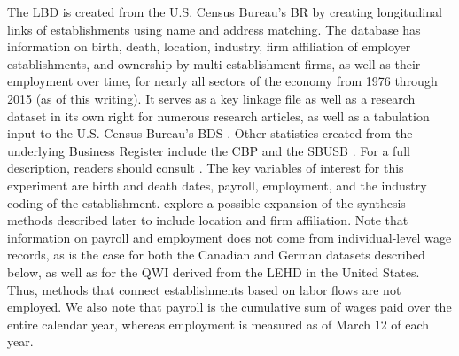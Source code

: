 The \ac{LBD} \citep{LBD} is created from the U.S. Census Bureau's \ac{BR} by creating longitudinal links of establishments using name and address matching. The database has information on birth, death, location, industry,  firm  affiliation of employer establishments, and ownership by multi-establishment firms, as well as their employment over time, for nearly all sectors of the economy from 1976 through 2015 (as of this writing). It serves as a key linkage file as well as a research dataset in its own right for numerous research articles, as well as a tabulation input to the U.S. Census Bureau's \acl{BDS} \citep[\acs{BDS}]{BDS}. Other statistics created from the underlying Business Register include the \acl{CBP} \citep[\acs{CBP}]{CBP} and the \acl{SBUSB} \citep[\acs{SBUSB}]{SBUSB}. For a full description, readers should consult  \citet{RePEc:cen:wpaper:02-17,}. The key variables of interest for this experiment are birth and death dates, payroll, employment, and the industry coding of the establishment.  \citet{SJIAOS-2014d} explore a possible expansion of the synthesis methods described later to include location and firm affiliation. Note that information on payroll and employment does not come from individual-level wage records, as is the case for both the Canadian and German datasets described below, as well as for the \acl{QWI} \citep{AbowdEtAl2009} derived from the \acl{LEHD} \citep[LEHD]{RePEc:cen:wpaper:18-27} in the United States. Thus, methods that connect establishments based on labor flows \citep{BenedettoEtAl2007,RePEc:iab:iabfme:201006_en} are not employed. We also note that payroll is the cumulative sum of wages paid over the entire calendar year, whereas employment is measured as of March 12 of each year.




